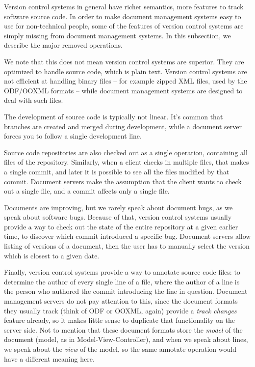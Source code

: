 Version control systems in general have richer semantics, more features to
track software source code. In order to make document management systems easy
to use for non-technical people, some of the features of version control
systems are simply missing from document management systems. In this
subsection, we describe the major removed operations.

We note that this does not mean version control systems are superior. They are
optimized to handle source code, which is plain text. Version control systems
are not efficient at handling binary files -- for example zipped XML files, used by
the ODF/OOXML formats -- while document management systems are designed to deal
with such files.

The development of source code is typically not linear. It's common that
branches are created and merged during development, while a document server
forces you to follow a single development line.

Source code repositories are also checked out as a single operation,
containing all files of the repository. Similarly, when a client checks in
multiple files, that makes a single commit, and later it is possible to see all
the files modified by that commit. Document servers make the assumption that
the client wants to check out a single file, and a commit affects only a single
file.

Documents are improving, but we rarely speak about document bugs, as we speak
about software bugs. Because of that, version control systems usually provide a
way to check out the state of the entire repository at a given earlier
time, to discover which commit introduced a specific bug. Document servers
allow listing of versions of a document, then the user has to manually select
the version which is closest to a given date.

Finally, version control systems provide a way to annotate source code files:
to determine the author of every single line of a file, where the author of a
line is the person who authored the commit introducing the line in question.
Document management servers do not pay attention to this, since the document
formats they usually track (think of ODF or OOXML, again) provide a \emph{track
changes} feature already, so it makes little sense to duplicate that
functionality on the server side. Not to mention that these document
formats store the \emph{model} of the document (model, as in
Model-View-Controller), and when we speak about lines, we speak about the
\emph{view} of the model, so the same annotate operation would have a different
meaning here.

